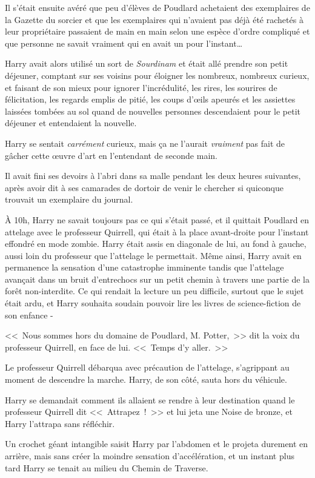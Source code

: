 Il s'était ensuite avéré que peu d'élèves de Poudlard achetaient des exemplaires de la Gazette du sorcier et que les exemplaires qui n'avaient pas déjà été rachetés à leur propriétaire passaient de main en main selon une espèce d'ordre compliqué et que personne ne savait vraiment qui en avait un pour l'instant…

Harry avait alors utilisé un sort de \emph{Sourdinam} et était allé prendre son petit déjeuner, comptant sur ses voisins pour éloigner les nombreux, nombreux curieux, et faisant de son mieux pour ignorer l'incrédulité, les rires, les sourires de félicitation, les regards emplis de pitié, les coups d'œils apeurés et les assiettes laissées tombées au sol quand de nouvelles personnes descendaient pour le petit déjeuner et entendaient la nouvelle.

Harry se sentait \emph{carrément} curieux, mais ça ne l'aurait \emph{vraiment} pas fait de gâcher cette œuvre d'art en l'entendant de seconde main.

Il avait fini ses devoirs à l'abri dans sa malle pendant les deux heures suivantes, après avoir dit à ses camarades de dortoir de venir le chercher si quiconque trouvait un exemplaire du journal.

À 10h, Harry ne savait toujours pas ce qui s'était passé, et il quittait Poudlard en attelage avec le professeur Quirrell, qui était à la place avant-droite pour l'instant effondré en mode zombie. Harry était assis en diagonale de lui, au fond à gauche, aussi loin du professeur que l'attelage le permettait. Même ainsi, Harry avait en permanence la sensation d'une catastrophe imminente tandis que l'attelage avançait dans un bruit d'entrechocs sur un petit chemin à travers une partie de la forêt non-interdite. Ce qui rendait la lecture un peu difficile, surtout que le sujet était ardu, et Harry souhaita soudain pouvoir lire les livres de science-fiction de son enfance -

<<~Nous sommes hors du domaine de Poudlard, M. Potter,~>> dit la voix du professeur Quirrell, en face de lui. <<~Temps d'y aller.~>>

Le professeur Quirrell débarqua avec précaution de l'attelage, s'agrippant au moment de descendre la marche. Harry, de son côté, sauta hors du véhicule.

Harry se demandait comment ils allaient se rendre à leur destination quand le professeur Quirrell dit <<~Attrapez~!~>> et lui jeta une Noise de bronze, et Harry l'attrapa sans réfléchir.

Un crochet géant intangible saisit Harry par l'abdomen et le projeta durement en arrière, mais sans créer la moindre sensation d'accélération, et un instant plus tard Harry se tenait au milieu du Chemin de Traverse.

